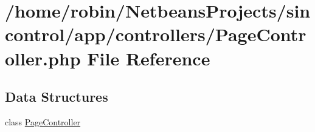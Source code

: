\hypertarget{_page_controller_8php}{}\section{/home/robin/\+Netbeans\+Projects/sincontrol/app/controllers/\+Page\+Controller.php File Reference}
\label{_page_controller_8php}
\subsection*{Data Structures}
\begin{DoxyCompactItemize}
\item 
class \hyperlink{class_page_controller}{Page\+Controller}
\end{DoxyCompactItemize}
